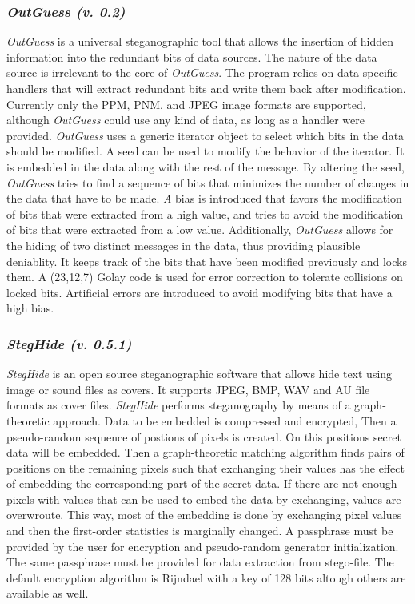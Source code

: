 \documentclass[11pt]{article}
\begin{document}
\subsubsection{\textit{OutGuess (v. 0.2)}}
\textit{OutGuess} is a universal steganographic tool that allows the insertion of hidden information into the  
redundant  bits of data sources. The nature of the data source is irrelevant to the core of \textit{OutGuess}.  The program relies on  
data specific handlers that will extract redundant bits and write them back after modification. Currently only the PPM, 
PNM, and JPEG image formats are supported, although \textit{OutGuess} could use  any  kind  of data, as long as a handler were provided.
\textit{OutGuess} uses  a  generic  iterator  object  to  select  which bits in the data should be modified. A seed can be used 
to modify the behavior of the iterator. It is embedded in the data along with the rest of the message.  
By altering the seed, \textit{OutGuess} tries to find a sequence of bits that minimizes the number of changes in the data that have to be 
made. \textit A bias is introduced that favors the modification of bits that were extracted from a high value, and tries to avoid the 
modification of bits that were extracted from a low value.
Additionally, \textit{OutGuess}  allows  for the hiding of two distinct messages in the data, thus providing plausible 
deniablity.  It keeps track of the bits that have been modified previously and locks them. A (23,12,7)  Golay  code  
is used for error correction to tolerate collisions on locked bits.  Artificial errors are introduced to avoid modifying bits 
that have a high bias.


\subsubsection{\textit{StegHide (v. 0.5.1)}}
\textit{StegHide} is an open source steganographic software that allows hide text using image or sound files as covers. 
It supports JPEG, BMP, WAV and AU file formats as cover files. 
\textit{StegHide} performs steganography by means of a graph-theoretic approach. Data to be embedded is compressed and encrypted,
Then a pseudo-random sequence of postions of pixels is created. On this positions secret data will be embedded. Then a
graph-theoretic  matching  algorithm finds pairs of positions on the remaining pixels such that exchanging their values has
the effect of embedding the corresponding  part of the secret data. If there are not enough pixels with values that can be used
to embed the data by exchanging, values are overwroute. This way, most of the embedding  is  done  by  exchanging  pixel  values
and then the first-order statistics is marginally changed. A passphrase must be provided by the user for encryption and
pseudo-random generator initialization. The same passphrase must be provided for data extraction from stego-file. The default
encryption algorithm is Rijndael with a key of 128 bits altough others are available as well.
\end{document}
